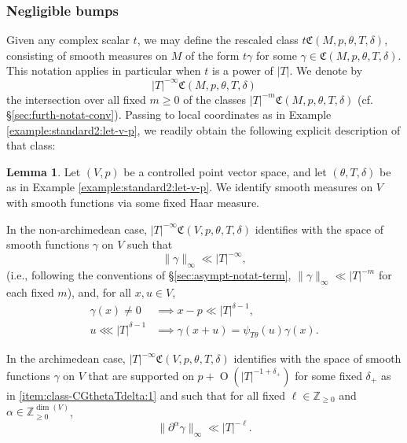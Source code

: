 \documentclass[reqno]{amsart}
\def\O{\operatorname{O}}
\theoremstyle{plain} \newtheorem{theorem} {Theorem}
\theoremstyle{definition} \newtheorem{definition} [theorem] {Definition}
\theoremstyle{itplain} %
\newtheorem{lemma}[theorem]{Lemma}
\numberwithin{equation}{section}
\numberwithin{theorem}{section}
\renewcommand{\geq}{\geqslant}
\begin{document}
\subsubsection{Negligible bumps}
Given any complex scalar $t$, we may define the rescaled class $t \mathfrak{C}(M,p,\theta,T,\delta)$, consisting of smooth measures on $M$ of the form $t \gamma$ for some $\gamma \in \mathfrak{C}(M,p,\theta,T,\delta)$.  This notation applies in particular when $t$ is a power of $|T|$.  We denote by
\begin{equation*}
  |T|^{-\infty} \mathfrak{C}(M,p,\theta,T,\delta)
\end{equation*}
the intersection over all fixed $m \geq 0$ of the classes $|T|^{-m} \mathfrak{C}(M,p,\theta,T,\delta)$ (cf. \S\ref{sec:furth-notat-conv}).  Passing to local coordinates as in Example \ref{example:standard2:let-v-p}, we readily obtain the following explicit description of that class:
\begin{lemma}\label{lem:standard2:let-v-p}
  Let $(V,p)$ be a controlled point vector space, and let $(\theta,T,\delta)$ be as in Example \ref{example:standard2:let-v-p}.  We identify smooth measures on $V$ with smooth functions via some fixed Haar measure.

  In the non-archimedean case, $|T|^{-\infty} \mathfrak{C}(V,p,\theta,T,\delta)$ identifies with the space of smooth functions $\gamma$ on $V$ such that
  \begin{equation}\label{eq:gamma-_infty-ll}
    \|\gamma \|_{\infty} \ll |T|^{-\infty},
  \end{equation}
  (i.e., following the conventions of \S\ref{sec:asympt-notat-term}, $\|\gamma \|_{\infty} \ll |T|^{-m}$ for each fixed $m$), and, for all $x,u \in V$,
  \begin{align*}
    \gamma(x) \neq 0 &\implies x - p \ll  |T|^{\delta-1}, \\
    u \lll |T|^{\delta-1} &\implies \gamma(x+u) = \psi_{T \theta}(u) \gamma(x).
  \end{align*}

  In the archimedean case,  $|T|^{-\infty} \mathfrak{C}(V,p,\theta,T,\delta)$ identifies with the space of smooth functions $\gamma$ on $V$ that are supported on  $p + \O(|T|^{-1 + \delta_+})$ for some fixed $\delta_+$ as in  \eqref{item:class-CGthetaTdelta:1} and such that for all fixed $\ell \in \mathbb{Z}_{\geq 0}$ and $\alpha \in \mathbb{Z}_{\geq 0}^{\dim(V)}$,
  \begin{equation*}
      \|\partial^\alpha \gamma\|_{\infty}
      \ll |T|^{-\ell}.
    \end{equation*}
\end{lemma}
\end{document}
